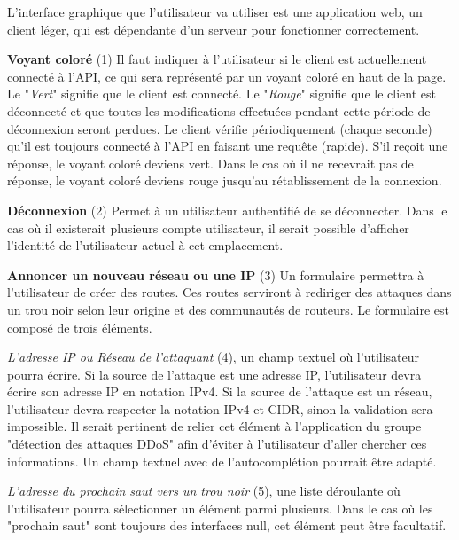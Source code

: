 L'interface graphique que l'utilisateur va utiliser est une application web, un client léger, qui est dépendante d'un serveur pour fonctionner correctement.\newline

\textbf{Voyant coloré} (1)\newline
Il faut indiquer à l'utilisateur si le client est actuellement connecté à l'API, ce qui sera représenté par un voyant coloré en haut de la page. Le "\textit{Vert}" signifie que le client est connecté. Le "\textit{Rouge}" signifie que le client est déconnecté et que toutes les modifications effectuées pendant cette période de déconnexion seront perdues.
Le client vérifie périodiquement (chaque seconde) qu'il est toujours connecté à l'API en faisant une requête (rapide).
S'il reçoit une réponse, le voyant coloré deviens vert.
Dans le cas où il ne recevrait pas de réponse, le voyant coloré deviens rouge jusqu'au rétablissement de la connexion.\newline

\textbf{Déconnexion} (2)\newline
Permet à un utilisateur authentifié de se déconnecter.
Dans le cas où il existerait plusieurs compte utilisateur, il serait possible d'afficher l'identité de l'utilisateur actuel à cet emplacement.\newline

\textbf{Annoncer un nouveau réseau ou une IP} (3)\newline
Un formulaire permettra à l'utilisateur de créer des routes. Ces routes serviront à rediriger des attaques dans un trou noir selon leur origine et des communautés de routeurs. Le formulaire est composé de trois éléments.

\textit{L'adresse IP ou Réseau de l'attaquant} (4), un champ textuel où l'utilisateur pourra écrire.
Si la source de l'attaque est une adresse IP, l'utilisateur devra écrire son adresse IP en notation IPv4.
Si la source de l'attaque est un réseau, l'utilisateur devra respecter la notation IPv4 et CIDR, sinon la validation sera impossible. Il serait pertinent de relier cet élément à l'application du groupe "détection des attaques DDoS" afin d'éviter à l'utilisateur d'aller chercher ces informations.
Un champ textuel avec de l'autocomplétion pourrait être adapté.

\textit{L'adresse du prochain saut vers un trou noir} (5), une liste déroulante où l'utilisateur pourra sélectionner un élément parmi plusieurs. Dans le cas où les "prochain saut" sont toujours des interfaces null, cet élément peut être facultatif.


